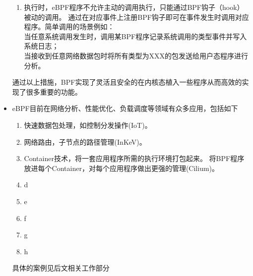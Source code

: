 \documentclass[AutoFakeBold,a4paper]{ctexart}
\begin{document}
\begin{itemize}
\begin{enumerate}
        \item 执行时，eBPF程序不允许主动的调用执行，只能通过BPF钩子（hook）被动的调用。
        通过在对应事件上注册BPF钩子即可在事件发生时调用对应程序。简单调用的场景例如：\\
        当任意系统调用发生时，调用某BPF程序记录系统调用的类型事件并写入系统日志；\\
        当接收到任意网络数据包时将所有类型为XXX的包发送给用户态程序进行分析。
    \end{enumerate}
    通过以上措施，BPF实现了灵活且安全的在内核态植入一些程序从而高效的实现了很多重要的功能。

    \item eBPF目前在网络分析、性能优化、负载调度等领域有众多应用，包括如下
    \begin{enumerate}
        \item 快速数据包处理，如控制分发操作(IoT)。
        \item 网络路由，子节点的路径管理(InKeV)。
        \item Container技术，将一套应用程序所需的执行环境打包起来。
        将BPF程序放进每个Container，对每个应用程序做出更强的管理(Cilium)。
        \item d
        \item e
        \item f
        \item g
        \item h
    \end{enumerate}
    具体的案例见后文相关工作部分

    



\end{itemize}
\end{document}
